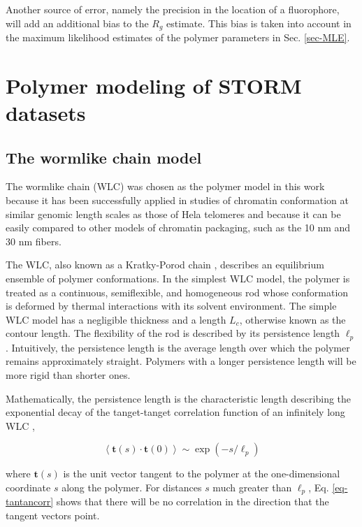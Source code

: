 \documentclass[12pt, a4paper]{article}
\begin{document}
Another source of error, namely the precision in the location of a
fluorophore, will add an additional bias to the $R_g$
estimate. This bias is taken into account in the maximum
likelihood estimates of the polymer parameters in
Sec. \ref{sec-MLE}.

\section{Polymer modeling of STORM datasets}
\label{sec-2}

\subsection{The wormlike chain model}
\label{sec-2-1}
The wormlike chain (WLC) was chosen as the polymer model in this
work because it has been successfully applied in studies of
chromatin conformation at similar genomic length scales as those of
Hela telomeres \cite{bystricky-pnas-2004, huet-2014} and because it
can be easily compared to other models of chromatin packaging, such
as the 10 nm and 30 nm fibers.

The WLC, also known as a Kratky-Porod chain
\cite{kratkyporod-1949}, describes an equilibrium ensemble of
polymer conformations.  In the simplest WLC model, the polymer is
treated as a continuous, semiflexible, and homogeneous rod whose
conformation is deformed by thermal interactions with its solvent
environment. The simple WLC model has a negligible thickness and a
length $L_c$, otherwise known as the contour length. The
flexibility of the rod is described by its persistence length
$\ell_p$. Intuitively, the persistence length is the average length
over which the polymer remains approximately straight. Polymers
with a longer persistence length will be more rigid than shorter
ones.

Mathematically, the persistence length is the characteristic length
describing the exponential decay of the tanget-tanget correlation
function of an infinitely long WLC
\cite{phillips-pbotc-2009, schellman-biopolymers-1974},

\begin{equation}
  \label{eq-tantancorr}
  \left< \mathbf{t} \left( s \right) \cdot \mathbf{t} \left( 0 \right) \right> \sim \exp \left( -s / \ell_p \right)
\end{equation}

where $\mathbf{t} \left( s \right)$ is the unit vector tangent to
the polymer at the one-dimensional coordinate $s$ along the
polymer. For distances $s$ much greater than $\ell_p$, Eq.
\eqref{eq-tantancorr} shows that there will be no correlation in
the direction that the tangent vectors point.
\end{document}
